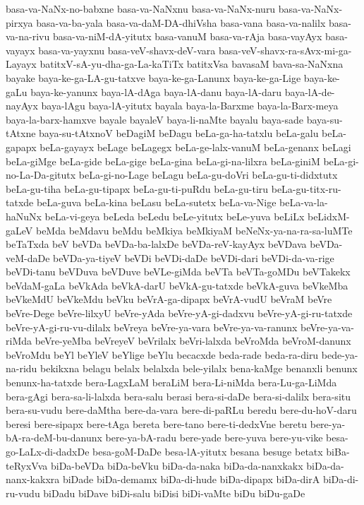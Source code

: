 {basa-va-NaNx-no-babxne
basa-va-NaNxnu
basa-va-NaNx-nuru
basa-va-NaNx-pirxya
basa-va-ba-yala
basa-va-daM-DA-dhiVsha
basa-vana
basa-va-nalilx
basa-va-na-rivu
basa-va-niM-dA-yitutx
basa-vanuM
basa-va-rAja
basa-vayAyx
basa-vayayx
basa-va-yayxnu
basa-veV-shavx-deV-vara
basa-veV-shavx-ra-sAvx-mi-ga-Layayx
batitxV-sA-yu-dha-ga-La-kaTiTx
batitxVsa
bavasaM
bava-sa-NaNxna
bayake
baya-ke-ga-LA-gu-tatxve
baya-ke-ga-Lanunx
baya-ke-ga-Lige
baya-ke-gaLu
baya-ke-yanunx
baya-lA-dAga
baya-lA-danu
baya-lA-daru
baya-lA-de-nayAyx
baya-lAgu
baya-lA-yitutx
bayala
baya-la-Barxme
baya-la-Barx-meya
baya-la-barx-hamxve
bayale
bayaleV
baya-li-naMte
bayalu
baya-sade
baya-su-tAtxne
baya-su-tAtxnoV
beDagiM
beDagu
beLa-ga-ha-tatxlu
beLa-galu
beLa-gapapx
beLa-gayayx
beLage
beLagegx
beLa-ge-lalx-vanuM
beLa-genanx
beLagi
beLa-giMge
beLa-gide
beLa-gige
beLa-gina
beLa-gi-na-lilxra
beLa-giniM
beLa-gi-no-La-Da-gitutx
beLa-gi-no-Lage
beLagu
beLa-gu-doVri
beLa-gu-ti-didxtutx
beLa-gu-tiha
beLa-gu-tipapx
beLa-gu-ti-puRdu
beLa-gu-tiru
beLa-gu-titx-ru-tatxde
beLa-guva
beLa-kina
beLasu
beLa-sutetx
beLa-va-Nige
beLa-va-la-haNuNx
beLa-vi-geya
beLeda
beLedu
beLe-yitutx
beLe-yuva
beLiLx
beLidxM-gaLeV
beMda
beMdavu
beMdu
beMkiya
beMkiyaM
beNeNx-ya-na-ra-sa-luMTe
beTaTxda
beV
beVDa
beVDa-ba-lalxDe
beVDa-reV-kayAyx
beVDava
beVDa-veM-daDe
beVDa-ya-tiyeV
beVDi
beVDi-daDe
beVDi-dari
beVDi-da-va-rige
beVDi-tanu
beVDuva
beVDuve
beVLe-giMda
beVTa
beVTa-goMDu
beVTakekx
beVdaM-gaLa
beVkAda
beVkA-darU
beVkA-gu-tatxde
beVkA-guva
beVkeMba
beVkeMdU
beVkeMdu
beVku
beVrA-ga-dipapx
beVrA-vudU
beVraM
beVre
beVre-Dege
beVre-lilxyU
beVre-yAda
beVre-yA-gi-dadxvu
beVre-yA-gi-ru-tatxde
beVre-yA-gi-ru-vu-dilalx
beVreya
beVre-ya-vara
beVre-ya-va-ranunx
beVre-ya-va-riMda
beVre-yeMba
beVreyeV
beVrilalx
beVri-lalxda
beVroMda
beVroM-danunx
beVroMdu
beYl
beYleV
beYlige
beYlu
becacxde
beda-rade
beda-ra-diru
bede-ya-na-ridu
bekikxna
belagu
belalx
belalxda
bele-yilalx
bena-kaMge
benanxli
benunx
benunx-ha-tatxde
bera-LagxLaM
beraLiM
bera-Li-niMda
bera-Lu-ga-LiMda
bera-gAgi
bera-sa-li-lalxda
bera-salu
berasi
bera-si-daDe
bera-si-dalilx
bera-situ
bera-su-vudu
bere-daMtha
bere-da-vara
bere-di-paRLu
beredu
bere-du-hoV-daru
beresi
bere-sipapx
bere-tAga
bereta
bere-tano
bere-ti-dedxVne
beretu
bere-ya-bA-ra-deM-bu-danunx
bere-ya-bA-radu
bere-yade
bere-yuva
bere-yu-vike
besa-go-LaLx-di-dadxDe
besa-goM-DaDe
besa-lA-yitutx
besana
besuge
betatx
biBa-teRyxVva
biDa-beVDa
biDa-beVku
biDa-da-naka
biDa-da-nanxkakx
biDa-da-nanx-kakxra
biDade
biDa-demamx
biDa-di-hude
biDa-dipapx
biDa-dirA
biDa-di-ru-vudu
biDadu
biDave
biDi-salu
biDisi
biDi-vaMte
biDu
biDu-gaDe
}
